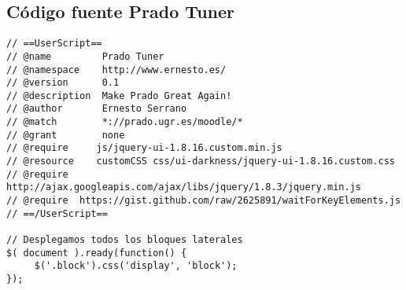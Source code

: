 \subsection{Código fuente Prado Tuner}
\begin{lstlisting}	
// ==UserScript==
// @name         Prado Tuner 
// @namespace    http://www.ernesto.es/
// @version      0.1
// @description  Make Prado Great Again!
// @author       Ernesto Serrano
// @match        *://prado.ugr.es/moodle/*
// @grant        none
// @require     js/jquery-ui-1.8.16.custom.min.js
// @resource    customCSS css/ui-darkness/jquery-ui-1.8.16.custom.css
// @require  http://ajax.googleapis.com/ajax/libs/jquery/1.8.3/jquery.min.js
// @require  https://gist.github.com/raw/2625891/waitForKeyElements.js
// ==/UserScript==

// Desplegamos todos los bloques laterales
$( document ).ready(function() {
     $('.block').css('display', 'block');
});
\end{lstlisting}

